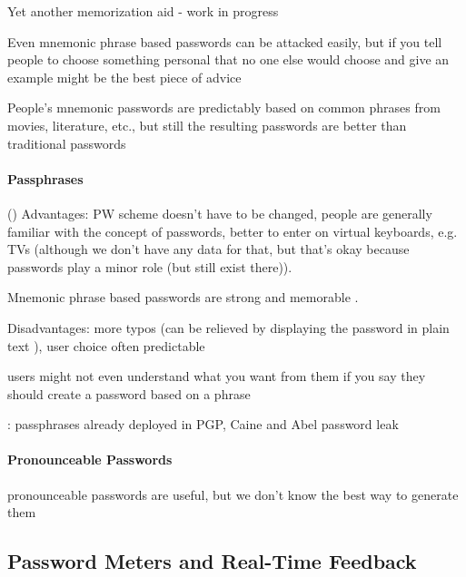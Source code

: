 	Yet another memorization aid - work in progress \cite{Lyastani2016PWMangling} 
	
	Even mnemonic phrase based passwords can be attacked easily, but if you tell people to choose something personal that no one else would choose and give an example might be the best piece of advice \cite{Yang2016MnemonicSentenceBased}
	
	People's mnemonic passwords are predictably based on common phrases from movies, literature, etc., but still the resulting passwords are better than traditional passwords \cite{Kuo2006HumanSelectionMnemonic}
	
	\paragraph{Passphrases}
	()
	Advantages: PW scheme doesn't have to be changed, people are generally familiar with the concept of passwords, better to enter on virtual keyboards, e.g. TVs (although we don't have any data for that, but that's okay because passwords play a minor role (but still exist there)).
	
	Mnemonic phrase based passwords are strong and memorable \cite{Yan2004PasswordMemorabilitySecurity}.
	
	\cite{Keith2009PassphraseDesign}
	
	Disadvantages: more typos (can be relieved by displaying the password in plain text  \cite{Melicher2016UsabilityMobileTextPasswords}), user choice often predictable
	
	users might not even understand what you want from them if you say they should create a password based on a phrase \cite{Forget2007HelpingUsers}
	
	\cite{Bonneau2012LinguisticProperties}: passphrases already deployed in PGP, Caine and Abel password leak \cite{Carnavalet2014AnalyzingPWStrengthMeters} 
	
	\cite{Shay2012CorrectHorseBatteryStaple}
	
	
	\paragraph{Pronounceable Passwords}
	pronounceable passwords are useful, but we don't know the best way to generate them \cite{Goldberg2015UnspeakablePasswords}
	
	
	\subsection{Password Meters and Real-Time Feedback}
	
